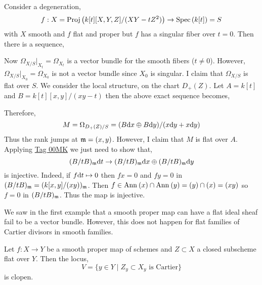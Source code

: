 \documentclass[12pt]{article}
\begin{document}
\begin{example}
Consider a degeneration, 
\[ f : X = \mathrm{Proj}\left( k[t][X,Y,Z]/(XY - t Z^2) \right) \to \mathrm{Spec}\left( k[t] \right) = S \]
with $X$ smooth and $f$ flat and proper but $f$ has a singular fiber over $t = 0$. Then there is a sequence,
\begin{center}
\end{center}
Now $\Omega_{X/S} |_{X_t} = \Omega_{X_t}$ is a vector bundle for the smooth fibers ($t \neq 0$). However, $\Omega_{X/S}|_{X_0} = \Omega_{X_0}$ is not a vector bundle since $X_0$ is singular. I claim that $\Omega_{X/S}$ is flat over $S$. We consider the local structure, on the chart $D_+(Z)$. Let $A = k[t]$ and $B = k[t][x,y]/(xy - t)$ then the above exact sequence becomes,
\begin{center}
\end{center}
Therefore,
\[ M = \Omega_{D_+(Z)/S} = (B \mathrm{d}{x} \oplus B \mathrm{d}{y})/(x \mathrm{d}{y} + x \mathrm{d}{y}) \]
Thus the rank jumps at $\mathfrak{m} = (x,y)$. However, I claim that $M$ is flat over $A$. Applying \href{https://stacks.math.columbia.edu/tag/00MK}{Tag 00MK} we just need to show that,
\[ (B / t B)_{\mathfrak{m}} \mathrm{d}{t} \to (B / t B)_{\mathfrak{m}} \mathrm{d}{x} \oplus  (B / t B)_{\mathfrak{m}} \mathrm{d}{y}  \]
is injective. Indeed, if $f \mathrm{d}{t} \mapsto 0$ then $fx = 0$ and $fy = 0$ in $(B / t B)_{\mathfrak{m}} = (k[x,y]/(xy))_{\mathfrak{m}}$. Then $f \in \mathrm{Ann}_{}\left(x\right) \cap \mathrm{Ann}_{}\left(y\right) = (y) \cap (x) = (xy)$ so $f = 0$ in $(B / t B)_{\mathfrak{m}}$. Thus the map is injective.
\end{example}

\begin{rmk}
We saw in the first example that a smooth proper map can have a flat ideal sheaf fail to be a vector bundle. However, this does not happen for flat families of Cartier divisors in smooth families.
\end{rmk}

\begin{prop}
Let $f : X \to Y$ be a smooth proper map of schemes and $Z \subset X$ a closed subscheme flat over $Y$. Then the locus,
\[ V = \{ y \in Y \mid Z_y \subset X_y \text{ is Cartier} \} \]
is clopen.
\end{prop}
\end{document}
